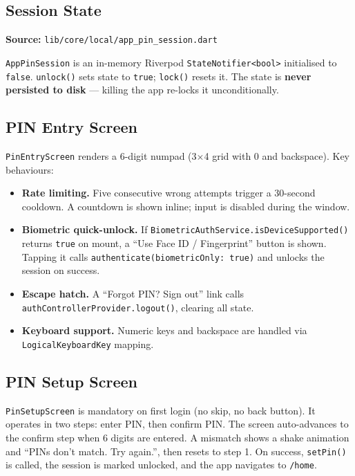 \documentclass[11pt,a4paper]{article}
\begin{document}
\subsection{Session State}

\textbf{Source:} \texttt{lib/core/local/app\_pin\_session.dart}

\texttt{AppPinSession} is an in-memory Riverpod \texttt{StateNotifier<bool>} initialised
to \texttt{false}. \texttt{unlock()} sets state to \texttt{true};
\texttt{lock()} resets it. The state is \textbf{never persisted to disk} --- killing the
app re-locks it unconditionally.

\subsection{PIN Entry Screen}

\texttt{PinEntryScreen} renders a 6-digit numpad (3$\times$4 grid with 0 and
backspace). Key behaviours:

\begin{itemize}
  \item \textbf{Rate limiting.} Five consecutive wrong attempts trigger a 30-second
    cooldown. A countdown is shown inline; input is disabled during the window.
  \item \textbf{Biometric quick-unlock.} If \texttt{BiometricAuthService.isDeviceSupported()}
    returns \texttt{true} on mount, a ``Use Face ID / Fingerprint'' button is shown.
    Tapping it calls \texttt{authenticate(biometricOnly: true)} and unlocks the session
    on success.
  \item \textbf{Escape hatch.} A ``Forgot PIN? Sign out'' link calls
    \texttt{authControllerProvider.logout()}, clearing all state.
  \item \textbf{Keyboard support.} Numeric keys and backspace are handled via
    \texttt{LogicalKeyboardKey} mapping.
\end{itemize}

\subsection{PIN Setup Screen}

\texttt{PinSetupScreen} is mandatory on first login (no skip, no back button). It
operates in two steps: enter PIN, then confirm PIN. The screen auto-advances to the
confirm step when 6 digits are entered. A mismatch shows a shake animation and
``PINs don't match. Try again.'', then resets to step 1. On success, \texttt{setPin()}
is called, the session is marked unlocked, and the app navigates to \texttt{/home}.
\end{document}
